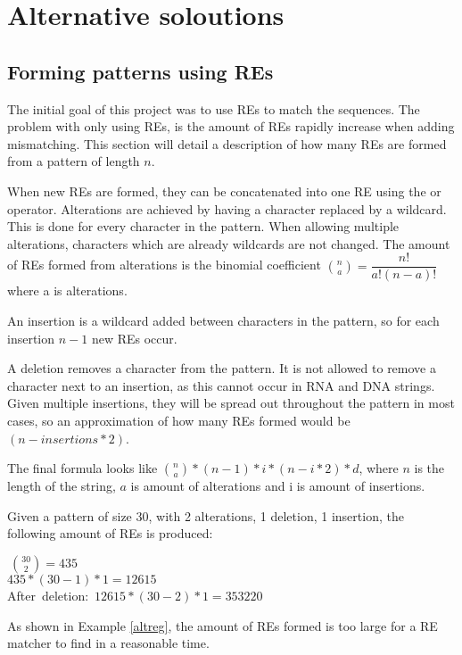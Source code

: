 \section{Alternative soloutions}
\subsection{Forming patterns using REs}
The initial goal of this project was to use REs to match the sequences. The problem with only using REs, is the amount of REs rapidly increase when adding mismatching. This section will detail a description of how many REs are formed from a pattern of length $n$.

When new REs are formed, they can be concatenated into one RE using the or operator. Alterations are achieved by having a character replaced by a wildcard. This is done for every character in the pattern. When allowing multiple alterations, characters which are already wildcards are not changed. The amount of REs formed from alterations is the binomial coefficient ${n \choose a}=\dfrac{n!}{a!(n-a)!}$ where a is alterations.

An insertion is a wildcard added between characters in the pattern, so for each insertion $n-1$ new REs occur. 

A deletion removes a character from the pattern. It is not allowed to remove a character next to an insertion, as this cannot occur in RNA and DNA strings. Given multiple insertions, they will be spread out throughout the pattern in most cases, so an approximation of how many REs formed would be $(n - insertions * 2)$.

The final formula looks like ${n \choose a}*(n-1)*i*(n-i*2)*d$, where $n$ is the length of the string, $a$ is amount of alterations and i is amount of insertions.

\begin{myex}\label{altreg}
Given a pattern of size 30, with 2 alterations, 1 deletion, 1 insertion, the following amount of REs is produced: \\
\begin{center}
 $~{30 \choose 2} = 435$\\
 $435 * (30-1) * 1 = 12615$\\
After~deletion:~$12615*(30-2) * 1 = 353220$
\end{center}
\end{myex}

As shown in Example \ref{altreg}, the amount of REs formed is too large for a RE matcher to find in a reasonable time. 


